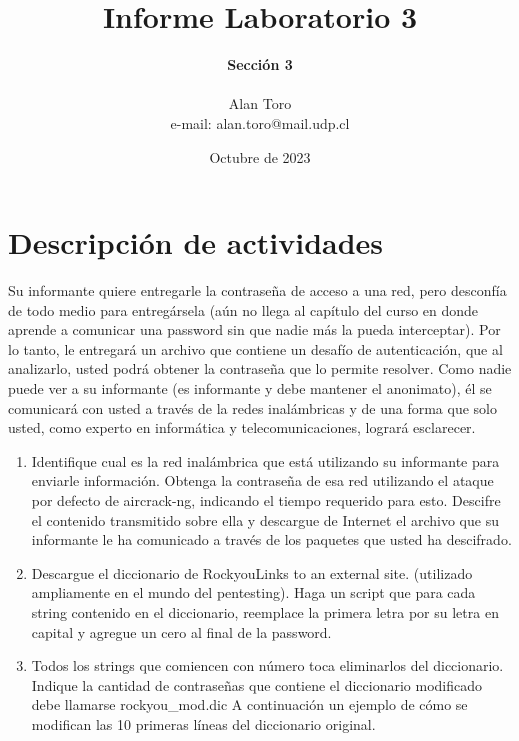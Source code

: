 \documentclass[letter,12pt]{article}
\begin{document}
   \title{\Huge{Informe Laboratorio 3}}
   \author{\textbf{Sección 3} \\  \\ Alan Toro\\ e-mail: alan.toro@mail.udp.cl}
   \date{Octubre de 2023}
   \maketitle
   \tableofcontents
  \newpage

\section{Descripción de actividades}
Su informante quiere entregarle la contraseña de acceso a una red, pero
desconfía de todo medio para entregársela (aún no llega al capítulo del curso en
donde aprende a comunicar una password sin que nadie más la pueda interceptar).
Por lo tanto, le entregará un archivo que contiene un desafío de autenticación,
que al analizarlo, usted podrá obtener la contraseña que lo permite resolver.
Como nadie puede ver a su informante (es informante y debe mantener el
anonimato), él se comunicará con usted a través de la redes inalámbricas y de
una forma que solo usted, como experto en informática y telecomunicaciones,
logrará esclarecer.

\begin{enumerate}
    \item Identifique cual es la red inalámbrica que está utilizando su
    informante para enviarle información. Obtenga la contraseña de esa red
    utilizando el ataque por defecto de aircrack-ng, indicando el tiempo requerido
    para esto. Descifre el contenido transmitido sobre ella y descargue de Internet
    el archivo que su informante le ha comunicado a través de los paquetes que usted
    ha descifrado.
    \item Descargue el diccionario de RockyouLinks to an external site.
    (utilizado ampliamente en el mundo del pentesting). Haga un script que para cada
    string contenido en el diccionario, reemplace la primera letra por su letra en
    capital y agregue un cero al final de la password.
    \item Todos los strings que comiencen con número toca eliminarlos del
    diccionario. Indique la cantidad de contraseñas que contiene el diccionario
    modificado debe llamarse rockyou\_mod.dic A continuación un ejemplo de cómo se
    modifican las 10 primeras líneas del diccionario original.
\end{enumerate}
\end{document}
